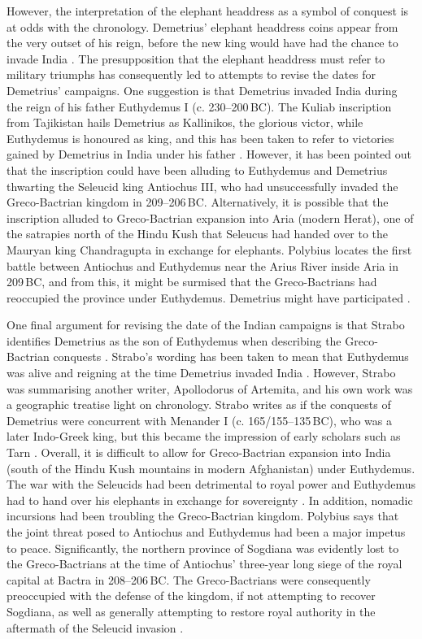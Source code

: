 \documentclass{ijsra}
\renewcommand\BC{{\,BC\xspace}}
\begin{document}
However, the interpretation of the elephant headdress as a symbol of conquest is at odds with the chronology.
Demetrius’ elephant headdress coins appear from the very outset of his reign, before the new king would have had the chance
to invade India \parencite[157]{Holt2012}.
The presupposition that the elephant headdress must refer to military triumphs has consequently led to attempts to revise the dates
for Demetrius’ campaigns.
One suggestion is that Demetrius invaded India during the reign of his father Euthydemus I (c. 230--200\BC).
The Kuliab inscription from Tajikistan hails Demetrius as Kallinikos, the glorious victor, while Euthydemus is honoured as king,
and this has been taken to refer to victories gained by Demetrius in India under his father \parencite[104--105]{MacDowall2007a}.
However, it has been pointed out that the inscription could have been alluding to Euthydemus and Demetrius thwarting the Seleucid king
Antiochus III, who had unsuccessfully invaded the Greco-Bactrian kingdom in 209--206\BC \parencite[48]{Bopearachchi2007}.
Alternatively, it is possible that the inscription alluded to Greco-Bactrian expansion into Aria (modern Herat),
one of the satrapies north of the Hindu Kush that Seleucus had handed over to the Mauryan king Chandragupta in exchange for elephants.
Polybius locates the first battle between Antiochus and Euthydemus near the Arius River inside Aria in 209\BC,
and from this, it might be surmised that the Greco-Bactrians had reoccupied the province under Euthydemus.
Demetrius might have participated \parencite[48]{Lerner1999}.

One final argument for revising the date of the Indian campaigns is that Strabo identifies Demetrius as the son of
Euthydemus when describing the Greco-Bactrian conquests \parencite[183]{Holt1999}.
Strabo’s wording has been taken to mean that Euthydemus was alive and reigning at the time Demetrius invaded India \parencite[157--158]{Holt2012}. 
However, Strabo was summarising another writer, Apollodorus of Artemita, and his own work was a geographic treatise light on chronology.
Strabo writes as if the conquests of Demetrius were concurrent with Menander I (c. 165/155--135\BC), who was a later Indo-Greek king,
but this became the impression of early scholars such as Tarn \parencite[144]{Tarn1951}.
Overall, it is difficult to allow for Greco-Bactrian expansion into India (south of the Hindu Kush mountains in modern Afghanistan)
under Euthydemus.
The war with the Seleucids had been detrimental to royal power and Euthydemus had to hand over his elephants in exchange for
sovereignty \parencite[130]{Holt1999}.
In addition, nomadic incursions had been troubling the Greco-Bactrian kingdom.
Polybius says that the joint threat posed to Antiochus and Euthydemus had been a major impetus to peace.
Significantly, the northern province of Sogdiana was evidently lost to the Greco-Bactrians at the time of Antiochus’
three-year long siege of the royal capital at Bactra in 208--206\BC \parencite[135]{Holt1999}.
The Greco-Bactrians were consequently preoccupied with the defense of the kingdom, if not attempting to recover Sogdiana,
as well as generally attempting to restore royal authority in the aftermath of the Seleucid invasion
\parencites[60--61]{Lerner1999}[236]{Widemann2000}.
\end{document}
